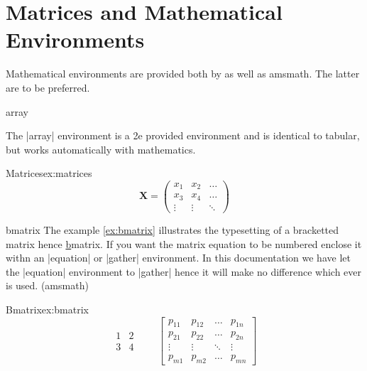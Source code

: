 \chapter{Matrices and Mathematical Environments}
\label{matrices}

Mathematical environments are provided both by \latexe as well as amsmath. The latter are to be preferred.


\begin{docEnvironment}{array}{}
\end{docEnvironment}
The |array| environment is a \latex2e provided environment and is identical to tabular, but works automatically with mathematics. 


\begin{texexample}{Matrices}{ex:matrices}
\[
\mathbf{X} = \left(
\begin{array}{ccc}
x_1 & x_2 & \ldots \\
x_3 & x_4 & \ldots \\
\vdots & \vdots & \ddots
\end{array} \right)
\]
\end{texexample}



\begin{docEnvironment}{bmatrix}{}
The example \ref{ex:bmatrix} illustrates the typesetting of a bracketted matrix hence \ul{b}matrix. If you want the matrix equation to be numbered enclose it withn an |equation| or |gather| environment. In this documentation we have let the |equation| environment to |gather| hence it will make no difference which ever is used. (amsmath)
\end{docEnvironment}

\begin{texexample}{Bmatrix}{ex:bmatrix}
\begin{equation}
\begin{matrix}
1 & 2 \\
3 & 4
\end{matrix} \qquad
\begin{bmatrix}
p_{11} & p_{12} & \ldots & p_{1n} \\
p_{21} & p_{22} & \ldots & p_{2n} \\
\vdots & \vdots & \ddots & \vdots \\
p_{m1} & p_{m2} & \ldots & p_{mn}
\end{bmatrix}
\end{equation}
\end{texexample}

